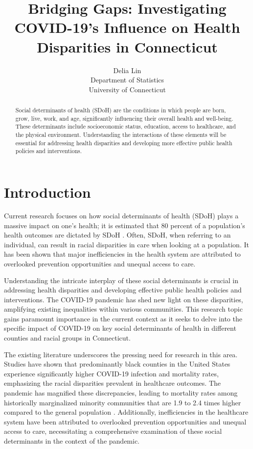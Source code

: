 \documentclass[12pt]{article}
\title{Bridging Gaps: Investigating COVID-19's Influence on Health Disparities in Connecticut}
\author{Delia Lin\\
  Department of Statistics\\
  University of Connecticut
}
\begin{document}
\maketitle

\begin{abstract}
  Social determinants of health (SDoH) are the conditions in which people are born, 
  grow, live, work, and age, significantly influencing their overall health and well-being. 
  These determinants include socioeconomic status, education, access to healthcare, and the 
  physical environment. Understanding the interactions of these elements will be essential for 
  addressing health disparities and developing more effective public health policies and interventions.
\end{abstract}

\section{Introduction}\label{sec:intro}


Current research focuses on how social determinants of health (SDoH) plays a  massive
impact on one's health; it is estimated that 80 percent of a population's health outcomes are 
dictated by SDoH \citep{HOOD2016129}. Often, SDoH, when referring to an individual, can result in racial 
disparities in care when looking at a population\citep{Monroe2023-uq}. It has been shown that major inefficiencies
in the health system are attributed to overlooked prevention opportunities and unequal access
to care.\citep{Allin2014-xn}

Understanding the intricate interplay of these social determinants is crucial in addressing health disparities 
and developing effective public health policies and interventions. The COVID-19 pandemic has shed new light on 
these disparities, amplifying existing inequalities within various communities. This research topic gains paramount 
importance in the current context as it seeks to delve into the specific impact of COVID-19 on key social determinants 
of health in different counties and racial groups in Connecticut.

The existing literature underscores the pressing need for research in this area. Studies have shown that predominantly 
black counties in the United States experience significantly higher COVID-19 infection and mortality rates, emphasizing 
the racial disparities prevalent in healthcare outcomes. The pandemic has magnified these discrepancies, leading to 
mortality rates among historically marginalized minority communities that are 1.9 to 2.4 times higher compared to the 
general population \citep{Badalov2022-wt}. Additionally, inefficiencies in the healthcare system have been attributed 
to overlooked prevention opportunities and unequal access to care, necessitating a comprehensive examination 
of these social determinants in the context of the pandemic.
\end{document}
